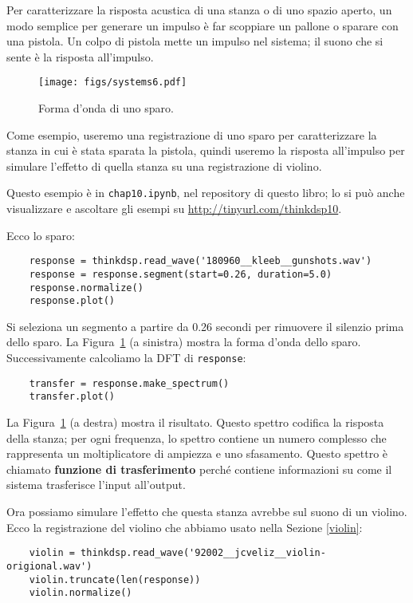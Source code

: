 \documentclass[12pt]{book} \usepackage[width=5.5in,height=8.5in, hmarginratio=3:2,vmarginratio=1:1]{geometry}
\begin{document}
Per caratterizzare la risposta acustica di una stanza o di uno spazio aperto, un modo semplice per generare un impulso è far scoppiare un pallone o sparare con una pistola. Un colpo di pistola mette un impulso nel sistema; il suono che si sente è la risposta all'impulso.

\begin{figure} 

\centerline{\texttt{[image: figs/systems6.pdf]}} \caption{Forma d'onda di uno sparo.} \label{fig.systems6} \end{figure} 

Come esempio, useremo una registrazione di uno sparo per caratterizzare la stanza in cui è stata sparata la pistola, quindi useremo la risposta all'impulso per simulare l'effetto di quella stanza su una registrazione di violino.

Questo esempio è in {\tt chap10.ipynb}, nel repository di questo libro; lo si può anche visualizzare e ascoltare gli esempi su \url{http://tinyurl.com/thinkdsp10}.

Ecco lo sparo:

\begin{verbatim}
    response = thinkdsp.read_wave('180960__kleeb__gunshots.wav')
    response = response.segment(start=0.26, duration=5.0)
    response.normalize()
    response.plot()
\end{verbatim} 

Si seleziona un segmento a partire da 0.26 secondi per rimuovere il silenzio prima dello sparo. La Figura~\ref{fig.systems6} (a sinistra) mostra la forma d'onda dello sparo. Successivamente calcoliamo la DFT di {\tt response}:

\begin{verbatim} 
    transfer = response.make_spectrum()
    transfer.plot()
 \end{verbatim} 

La Figura~\ref{fig.systems6} (a destra) mostra il risultato. Questo spettro codifica la risposta della stanza; per ogni frequenza, lo spettro contiene un numero complesso che rappresenta un moltiplicatore di ampiezza e uno sfasamento. Questo spettro è chiamato {\bf funzione di trasferimento} perché contiene informazioni su come il sistema trasferisce l'input all'output.

Ora possiamo simulare l'effetto che questa stanza avrebbe sul suono di un violino. Ecco la registrazione del violino che abbiamo usato nella Sezione \ref{violin}:

\begin{verbatim} 
    violin = thinkdsp.read_wave('92002__jcveliz__violin-origional.wav')
    violin.truncate(len(response))
    violin.normalize()
 \end{verbatim} 
\end{document}
